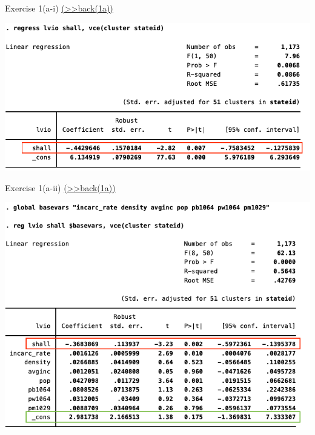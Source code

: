 \documentclass[
  10pt,
  ignorenonframetext,
]{beamer}
\begin{document}
\begin{frame}{Exercise 1(a-i)
\footnotesize \protect\hyperlink{Ex1-pooledOLS-A}{(\textgreater\textgreater back(1a))}
\normalsize }
\protect\hypertarget{Ex1-pooledsimple}{}
\begin{center}\includegraphics[width=0.9\linewidth]{pictures/Ex1-pooledsimple} \end{center}
\end{frame}

\begin{frame}{Exercise 1(a-ii)
\footnotesize \protect\hyperlink{Ex1-pooledOLS-A}{(\textgreater\textgreater back(1a))}
\normalsize }
\protect\hypertarget{Ex1-pooledwithctrls}{}
\begin{center}\includegraphics[width=0.9\linewidth]{pictures/Ex1-pooledwithctrols} \end{center}
\end{frame}
\end{document}

